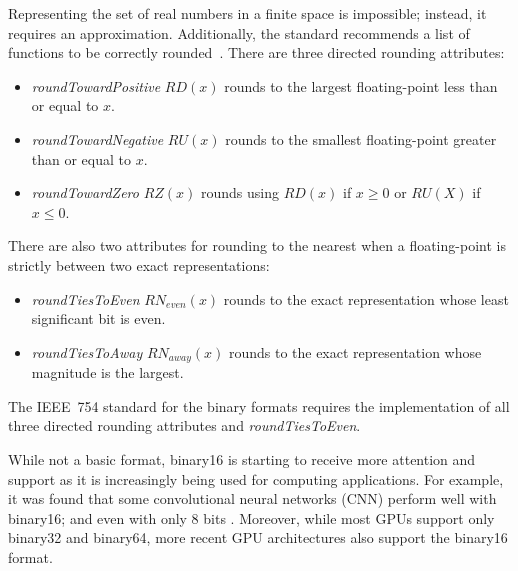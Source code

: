 Representing the set of real numbers in a finite space is impossible; instead, it requires an approximation.
Additionally, the standard recommends a list of functions to be correctly rounded~\cite{4610935}.
There are three directed rounding attributes:
\begin{itemize}
	\item \textit{roundTowardPositive} $RD(x)$ rounds to the largest floating-point less than or equal to $x$.
	\item \textit{roundTowardNegative} $RU(x)$ rounds to the smallest floating-point greater than or equal to $x$.
	\item \textit{roundTowardZero} $RZ(x)$ rounds using $RD(x)$ if $x \ge 0$ or $RU(X)$ if $x \le 0$.
\end{itemize}
There are also two attributes for rounding to the nearest when a floating-point is strictly between two exact representations:
\begin{itemize}
	\item \textit{roundTiesToEven} $RN_{even}(x)$ rounds to the exact representation whose least significant bit is even.
	\item \textit{roundTiesToAway} $RN_{away}(x)$ rounds to the exact representation whose magnitude is the largest.
\end{itemize}
The IEEE~754 standard for the binary formats requires the implementation of all three directed rounding attributes and \textit{roundTiesToEven}.
						
While not a basic format, binary16 is starting to receive more attention and support as it is increasingly being used for computing applications.
For example, it was found that some convolutional neural networks (CNN) perform well with binary16; and even with only 8 bits .
Moreover, while most GPUs support only binary32 and binary64, more recent GPU architectures also support the binary16 format.

